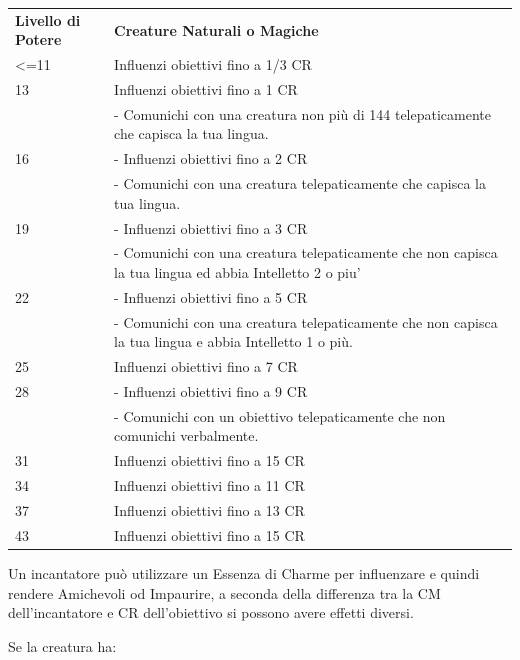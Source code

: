 \documentclass[a4paper,11pt,twoside,openany]{book}
\begin{document}
\medskip

\begin{tabular}{L{3cm} L{13cm}}
\toprule
\textbf{Livello di Potere} & \textbf{Creature Naturali o Magiche}\tabularnewline
<=11 &Influenzi obiettivi fino a 1/3 CR\\
13 & Influenzi obiettivi fino a 1 CR\\
& - Comunichi con una creatura non più di 144 telepaticamente che capisca la tua lingua.\\
16 & - Influenzi obiettivi fino a 2 CR\\
& - Comunichi con una creatura telepaticamente che capisca la tua lingua.\\
19 & - Influenzi obiettivi fino a 3 CR\\
& - Comunichi con una creatura telepaticamente che non capisca la tua lingua ed abbia Intelletto 2 o piu'\\
22 & - Influenzi obiettivi fino a 5 CR\\
& - Comunichi con una creatura telepaticamente che non capisca la tua lingua e abbia Intelletto 1 o più.\\
25 & Influenzi obiettivi fino a 7 CR \\
28 & - Influenzi obiettivi fino a 9 CR\\
& - Comunichi con un obiettivo telepaticamente che non comunichi verbalmente. \\
31 & Influenzi obiettivi fino a 15 CR\\
34 & Influenzi obiettivi fino a 11 CR\\
37 & Influenzi obiettivi fino a 13 CR\\
43 & Influenzi obiettivi fino a 15 CR\\
\end{tabular}

\medskip

Un incantatore può utilizzare un Essenza di Charme per influenzare e quindi rendere Amichevoli od Impaurire, a seconda della differenza tra la CM dell'incantatore e CR dell'obiettivo si possono avere effetti diversi.

\medskip

Se la creatura ha:
\end{document}
